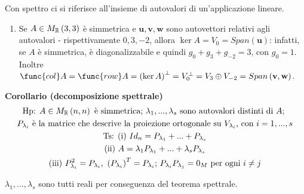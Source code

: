 \documentclass{article}
\begin{document}
Con spettro ci si riferisce all'insieme di autovalori di un'applicazione
lineare.

\begin{enumerate}
\item Se $A\in M_{%
\mathbb{R}
}\left( 3,3\right) $ \`{e} simmetrica e $\mathbf{u,v,w}$ sono autovettori
relativi agli autovalori - rispettivamente $0,3,-2$, allora $\ker
A=V_{0}=Span\left( \mathbf{u}\right) $: infatti, se $A$ \`{e} simmetrica, 
\`{e} diagonalizzabile e quindi $g_{0}+g_{3}+g_{-2}=3$, con $g_{0}=1$.
Inoltre $\func{col}A=\func{row}A=\left( \ker A\right) ^{\perp }=V_{0}^{\perp
}=V_{3}\oplus V_{-2}=Span\left( \mathbf{v,w}\right) $.
\end{enumerate}

\textbf{Corollario (decomposizione spettrale)}%
\begin{gather*}
\text{Hp}\text{: }A\in M_{%
\mathbb{R}
}\left( n,n\right) \text{ \`{e} simmetrica; }\lambda _{1},...,\lambda _{s}%
\text{ sono autovalori distinti di }A\text{; } \\
P_{\lambda _{i}}\text{ \`{e} la matrice che descrive la proiezione
ortogonale su }V_{\lambda _{i}}\text{, con }i=1,...,s \\
\text{Ts}\text{: (i) }Id_{n}=P_{\lambda _{1}}+...+P_{\lambda _{s}} \\
\text{(ii) }A=\lambda _{1}P_{\lambda _{1}}+...+\lambda _{s}P_{\lambda _{s}}
\\
\text{(iii) }P_{\lambda _{i}}^{2}=P_{\lambda _{i}}\text{, }\left( P_{\lambda
_{i}}\right) ^{T}=P_{\lambda _{i}}\text{; }P_{\lambda _{i}}P_{\lambda
_{j}}=0_{M}\text{ per ogni }i\neq j
\end{gather*}

$\lambda _{1},...,\lambda _{s}$ sono tutti reali per conseguenza del teorema
spettrale.
\end{document}
